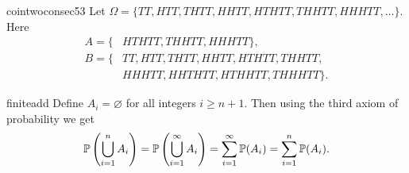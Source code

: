 \begin{sol}{cointwoconsec53}
    Let $\Omega=\{TT,HTT,THTT,HHTT,HTHTT,THHTT,HHHTT,\ldots\}$. Here
    \begin{align*}
        A=\{&HTHTT,THHTT,HHHTT\},\\
        B=\{&TT,HTT,THTT,HHTT,HTHTT,THHTT,\\&HHHTT,HHTHTT,HTHHTT,THHHTT\}.
    \end{align*}
\end{sol}

\begin{sol}{finiteadd}
    Define $A_i=\varnothing$ for all integers $i\ge n+1$. Then using the third axiom of probability we get
    \[
        \mathbb{P}\left(\bigcup_{i=1}^{n}A_i\right)=\mathbb{P}\left(\bigcup_{i=1}^{\infty}A_i\right)=\sum_{i=1}^{\infty}\mathbb{P}(A_i)=\sum_{i=1}^{n}\mathbb{P}(A_i).
    \]
\end{sol}

